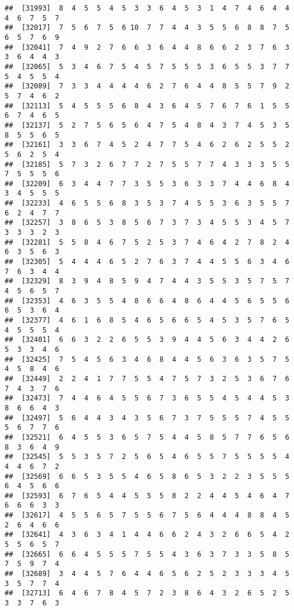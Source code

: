 \documentclass[
]{book}
\begin{document}
\begin{verbatim}
##  [31993]  8  4  5  5  4  5  3  3  6  4  5  3  1  4  7  4  6  4  4  4  6  7  5  7
##  [32017]  7  5  6  7  5  6 10  7  7  4  4  3  5  5  6  8  8  7  5  6  5  7  6  9
##  [32041]  7  4  9  2  7  6  6  3  6  4  4  8  6  6  2  3  7  6  3  3  6  4  4  3
##  [32065]  5  3  4  6  7  5  4  5  7  5  5  5  3  6  5  5  3  7  7  5  4  5  5  4
##  [32089]  7  3  3  4  4  4  4  6  2  7  6  4  4  8  5  5  7  9  2  5  7  4  6  2
##  [32113]  5  4  5  5  5  6  8  4  3  6  4  5  7  6  7  6  1  5  5  6  7  4  6  5
##  [32137]  5  2  7  5  6  5  6  4  7  5  4  8  4  3  7  4  5  3  5  8  5  5  6  5
##  [32161]  3  3  6  7  4  5  2  4  7  7  5  4  6  2  6  2  5  5  2  5  6  2  5  4
##  [32185]  5  7  3  2  6  7  7  2  7  5  5  7  7  4  3  3  3  5  5  7  5  5  5  6
##  [32209]  6  3  4  4  7  7  3  5  5  3  6  3  3  7  4  4  6  8  4  3  4  5  5  5
##  [32233]  4  6  5  5  6  8  3  5  3  7  4  5  5  3  6  3  5  5  7  6  2  4  7  7
##  [32257]  3  8  6  5  3  8  5  6  7  3  7  3  4  5  5  3  4  5  7  3  3  3  2  3
##  [32281]  5  5  8  4  6  7  5  2  5  3  7  4  6  4  2  7  8  2  4  6  3  5  6  3
##  [32305]  5  4  4  4  6  5  2  7  6  3  7  4  4  5  5  6  3  4  6  7  6  3  4  4
##  [32329]  8  3  9  4  8  5  9  4  7  4  4  3  5  5  3  5  7  5  7  4  5  6  5  7
##  [32353]  4  6  3  5  5  4  8  6  6  4  8  6  4  4  5  6  5  5  6  6  5  3  6  4
##  [32377]  4  6  1  6  8  5  4  6  5  6  6  5  4  5  3  5  7  6  5  4  5  5  5  4
##  [32401]  6  6  3  2  2  6  5  5  3  9  4  4  5  6  3  4  4  2  6  5  3  3  4  6
##  [32425]  7  5  4  5  6  3  4  6  8  4  4  5  6  3  6  3  5  7  5  4  5  8  4  6
##  [32449]  2  2  4  1  7  7  5  5  4  7  5  7  3  2  5  3  6  7  6  7  4  3  7  6
##  [32473]  7  4  4  6  4  5  5  6  7  3  6  5  5  4  5  4  4  5  3  8  6  6  4  3
##  [32497]  5  6  4  4  3  4  3  5  6  7  3  7  5  5  5  7  4  5  5  5  6  7  7  6
##  [32521]  6  4  5  5  3  6  5  7  5  4  4  5  8  5  7  7  6  5  6  8  3  6  4  9
##  [32545]  5  5  3  5  7  2  5  6  5  4  6  5  5  7  5  5  5  5  4  4  4  6  7  2
##  [32569]  6  6  5  3  5  5  4  6  5  8  6  5  3  2  2  3  5  5  5  6  4  5  6  6
##  [32593]  6  7  6  5  4  4  5  5  5  8  2  2  4  4  5  4  6  4  7  6  6  6  3  3
##  [32617]  4  5  5  6  5  7  5  5  6  7  5  6  4  4  4  8  8  4  5  2  6  4  6  6
##  [32641]  4  3  6  3  4  1  4  4  6  6  2  4  3  2  6  6  5  4  2  5  5  6  5  7
##  [32665]  6  6  4  5  5  5  7  5  5  4  3  6  3  7  3  3  5  8  5  7  5  9  7  4
##  [32689]  3  4  4  5  7  6  4  4  6  5  6  2  5  2  3  3  3  4  5  3  5  7  7  4
##  [32713]  6  4  6  7  8  4  5  7  2  3  8  6  4  3  2  6  5  2  5  3  3  7  6  3

\end{verbatim}
\end{document}
